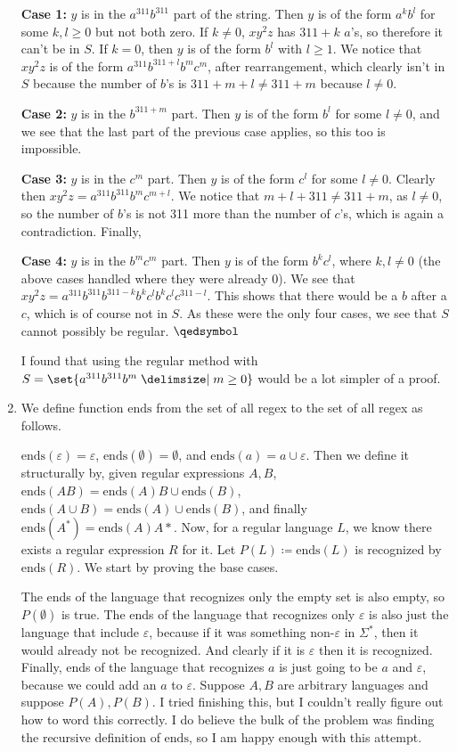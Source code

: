 \documentclass[12pt]{article}
\theoremstyle{definition}
\theoremstyle{remark}
\newcommand{\ve}{\varepsilon}
\renewcommand{\qed}{\hfill\qedsymbol}
\begin{document}
\begin{enumerate}[leftmargin=\labelsep]
		\textbf{Case 1:} $y$ is in the $a^{311}b^{311}$ part of the string. Then $y$ is of the form $a^kb^l$ for some $k, l \geq 0$ but not both zero. If $k \neq 0$, $xy^2z$ has $311+k$ $a$'s, so therefore it can't be in $S$. If $k = 0$, then $y$ is of the form $b^l$ with $l \geq 1$. We notice that $xy^2z$ is of the form $a^{311}b^{311+l}b^mc^m$, after rearrangement, which clearly isn't in $S$ because the number of $b$'s is $311+m+l \neq 311+m$ because $l \neq 0$. 
		
		\textbf{Case 2:} $y$ is in the $b^{311+m}$ part. Then $y$ is of the form $b^l$ for some $l \neq 0$, and we see that the last part of the previous case applies, so this too is impossible.
		
		\textbf{Case 3:} $y$ is in the $c^m$ part. Then $y$ is of the form $c^l$ for some $l \neq 0$. Clearly then $xy^2z = a^{311}b^{311}b^mc^{m+l}$. We notice that $m+l+311 \neq 311 + m$, as $l \neq 0$, so the number of $b$'s is not 311 more than the number of $c$'s, which is again a contradiction. Finally,
		
		\textbf{Case 4:} $y$ is in the $b^mc^m$ part. Then $y$ is of the form $b^kc^l$, where $k, l \neq 0$ (the above cases handled where they were already 0). We see that $xy^2z = a^{311}b^{311}b^{311-k}b^kc^lb^kc^lc^{311-l}$. This shows that there would be a $b$ after a $c$, which is of course not in $S$. As these were the only four cases, we see that $S$ cannot possibly be regular. $\qed$
		
		I found that using the regular method with $S = \set{a^{311}b^{311}b^m \given m \geq 0}$ would be a lot simpler of a proof. 
		
		\newpage
		\item We define function $\mathrm{ends}$ from the set of all regex to the set of all regex as follows. 
		
		$\mathrm{ends}(\ve) = \ve$, $\mathrm{ends}(\emptyset) = \emptyset$, and $\mathrm{ends}(a) = a \cup \ve$. Then we define it structurally by, given regular expressions $A, B$, $\mathrm{ends}(AB) = \mathrm{ends}(A)B\cup \mathrm{ends}(B)$, $\mathrm{ends}(A \cup B) = \mathrm{ends}(A) \cup \mathrm{ends}(B)$, and finally $\mathrm{ends}(A^*) = \mathrm{ends}(A) A*$. Now, for a regular language $L$, we know there exists a regular expression $R$ for it. Let $P(L) \coloneqq \mathrm{ends}(L)$ is recognized by $\mathrm{ends}(R)$. We start by proving the base cases.
		
		The ends of the language that recognizes only the empty set is also empty, so $P(\emptyset)$ is true. The ends of the language that recognizes only $\ve$ is also just the language that include $\ve$, because if it was something non-$\ve$ in $\Sigma^*$, then it would already not be recognized. And clearly if it is $\ve$ then it is recognized. Finally, ends of the language that recognizes $a$ is just going to be $a$ and $\ve$, because we could add an $a$ to $\ve$. Suppose $A, B$ are arbitrary languages and suppose $P(A), P(B)$. I tried finishing this, but I couldn't really figure out how to word this correctly. I do believe the bulk of the problem was finding the recursive definition of $\mathrm{ends}$, so I am happy enough with this attempt.
		\end{enumerate}
\end{document}
